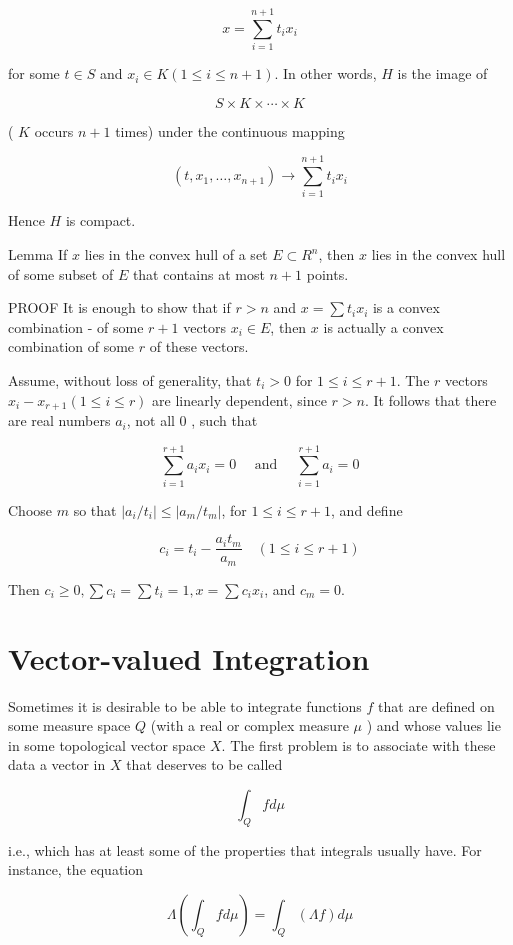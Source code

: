 \documentclass[10pt]{article}
\begin{document}
$$
x=\sum_{i=1}^{n+1} t_{i} x_{i}
$$

for some $t \in S$ and $x_{i} \in K(1 \leq i \leq n+1)$. In other words, $H$ is the image of

$$
S \times K \times \cdots \times K
$$

( $K$ occurs $n+1$ times) under the continuous mapping

$$
\left(t, x_{1}, \ldots, x_{n+1}\right) \rightarrow \sum_{i=1}^{n+1} t_{i} x_{i}
$$

Hence $H$ is compact.

Lemma If $x$ lies in the convex hull of a set $E \subset R^{n}$, then $x$ lies in the convex hull of some subset of $E$ that contains at most $n+1$ points.

PROOF It is enough to show that if $r>n$ and $x=\sum t_{i} x_{i}$ is a convex combination - of some $r+1$ vectors $x_{i} \in E$, then $x$ is actually a convex combination of some $r$ of these vectors.

Assume, without loss of generality, that $t_{i}>0$ for $1 \leq i \leq r+1$. The $r$ vectors $x_{i}-x_{r+1}(1 \leq i \leq r)$ are linearly dependent, since $r>n$. It follows that there are real numbers $a_{i}$, not all 0 , such that

$$
\sum_{i=1}^{r+1} a_{i} x_{i}=0 \quad \text { and } \quad \sum_{i=1}^{r+1} a_{i}=0
$$

Choose $m$ so that $\left|a_{i} / t_{i}\right| \leq\left|a_{m} / t_{m}\right|$, for $1 \leq i \leq r+1$, and define

$$
c_{i}=t_{i}-\frac{a_{i} t_{m}}{a_{m}} \quad(1 \leq i \leq r+1)
$$

Then $c_{i} \geq 0, \sum c_{i}=\sum t_{i}=1, x=\sum c_{i} x_{i}$, and $c_{m}=0$.

\section{Vector-valued Integration}
Sometimes it is desirable to be able to integrate functions $f$ that are defined on some measure space $Q$ (with a real or complex measure $\mu$ ) and whose values lie in some topological vector space $X$. The first problem is to associate with these data a vector in $X$ that deserves to be called

$$
\int_{Q} f d \mu
$$

i.e., which has at least some of the properties that integrals usually have. For instance, the equation

$$
\Lambda\left(\int_{Q} f d \mu\right)=\int_{Q}(\Lambda f) d \mu
$$
\end{document}
